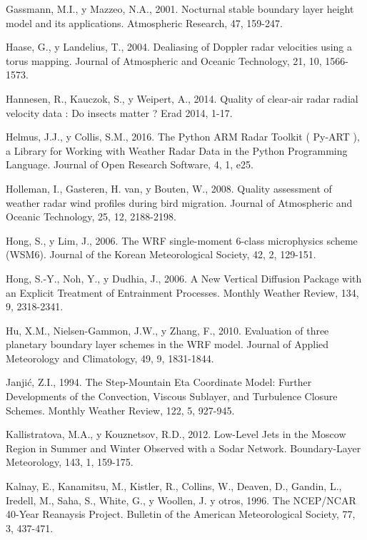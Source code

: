 \documentclass[12pt,spanish,oneside, a4paper]{book}
\begin{document}
\hypertarget{ref-Gassmann2001}{}
Gassmann, M.I., y Mazzeo, N.A., 2001. Nocturnal stable boundary layer
height model and its applications. Atmospheric Research, 47, 159-247.

\hypertarget{ref-Haase2004}{}
Haase, G., y Landelius, T., 2004. Dealiasing of Doppler radar velocities
using a torus mapping. Journal of Atmospheric and Oceanic Technology,
21, 10, 1566-1573.

\hypertarget{ref-Hannesen2014}{}
Hannesen, R., Kauczok, S., y Weipert, A., 2014. Quality of clear-air
radar radial velocity data : Do insects matter ? Erad 2014, 1-17.

\hypertarget{ref-Helmus2016}{}
Helmus, J.J., y Collis, S.M., 2016. The Python ARM Radar Toolkit (
Py-ART ), a Library for Working with Weather Radar Data in the Python
Programming Language. Journal of Open Research Software, 4, 1, e25.

\hypertarget{ref-Holleman2008}{}
Holleman, I., Gasteren, H. van, y Bouten, W., 2008. Quality assessment
of weather radar wind profiles during bird migration. Journal of
Atmospheric and Oceanic Technology, 25, 12, 2188-2198.

\hypertarget{ref-Hong2006a}{}
Hong, S., y Lim, J., 2006. The WRF single-moment 6-class microphysics
scheme (WSM6). Journal of the Korean Meteorological Society, 42, 2,
129-151.

\hypertarget{ref-Hong2006}{}
Hong, S.-Y., Noh, Y., y Dudhia, J., 2006. A New Vertical Diffusion
Package with an Explicit Treatment of Entrainment Processes. Monthly
Weather Review, 134, 9, 2318-2341.

\hypertarget{ref-Hu2010}{}
Hu, X.M., Nielsen-Gammon, J.W., y Zhang, F., 2010. Evaluation of three
planetary boundary layer schemes in the WRF model. Journal of Applied
Meteorology and Climatology, 49, 9, 1831-1844.

\hypertarget{ref-Janjic1994}{}
Janjić, Z.I., 1994. The Step-Mountain Eta Coordinate Model: Further
Developments of the Convection, Viscous Sublayer, and Turbulence Closure
Schemes. Monthly Weather Review, 122, 5, 927-945.

\hypertarget{ref-Kallistratova2012}{}
Kallistratova, M.A., y Kouznetsov, R.D., 2012. Low-Level Jets in the
Moscow Region in Summer and Winter Observed with a Sodar Network.
Boundary-Layer Meteorology, 143, 1, 159-175.

\hypertarget{ref-Kalnay1996}{}
Kalnay, E., Kanamitsu, M., Kistler, R., Collins, W., Deaven, D., Gandin,
L., Iredell, M., Saha, S., White, G., y Woollen, J. y otros, 1996. The
NCEP/NCAR 40-Year Reanaysis Project. Bulletin of the American
Meteorological Society, 77, 3, 437-471.
\end{document}
